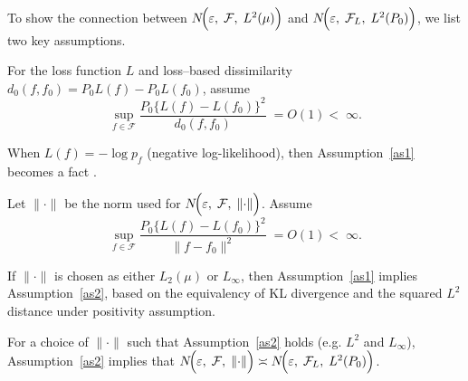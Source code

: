 To show the connection between $N\!\Bigl(\varepsilon,\; \mathcal{F},\; L^2(\mu)\Bigr)$ and $N\!\Bigl(\varepsilon,\; \mathcal{F}_L,\; L^2(P_0)\Bigr)$, we list two key assumptions.

\begin{assumption}\label{as1}
For the loss function \(L\) and loss–based dissimilarity 
\(d_{0}(f,f_{0}) = P_{0}L(f) - P_{0}L(f_{0})\),
assume 
\[
\sup_{f \in \mathcal{F}}
\frac{P_{0}\!\bigl\{L(f) - L(f_{0})\bigr\}^{2}}
     {d_{0}(f,f_{0})}
\;= O(1) <\;\infty.
\]
\end{assumption}

\begin{remark}
When \(L(f) = -\log p_f\) (negative log-likelihood), then Assumption~\ref{as1} becomes a fact \citet{van2004asymptotic}.
\end{remark}

\begin{assumption}\label{as2}
Let \(\lVert\cdot\rVert\) be the norm used for  $N\!\Bigl(\varepsilon,\; \mathcal{F},\; \lVert\cdot\rVert\Bigr)$.  
Assume
\[
\sup_{f \in \mathcal{F}}
\frac{P_{0}\!\bigl\{L(f) - L(f_{0})\bigr\}^{2}}
     {\lVert f - f_{0}\rVert^{2}}
\; = O(1) <\;\infty.
\]
\end{assumption}

\begin{remark}
If \(\lVert\cdot\rVert\) is chosen as either \(L_{2}(\mu)\) or \(L_{\infty}\),
then Assumption~\ref{as1} implies Assumption~\ref{as2}, based on the equivalency of KL divergence and the squared $L^2$ distance under positivity assumption.
\end{remark}

\begin{theorem}\label{Covering number equivalency}
For a choice of \(\lVert\cdot\rVert\) such that Assumption~\ref{as2} holds (e.g. $L^2$ and $L_{\infty}$), Assumption~\ref{as2} implies that $N\!\Bigl(\varepsilon,\; \mathcal{F},\; \lVert\cdot\rVert\Bigr) \asymp N\!\Bigl(\varepsilon,\; \mathcal{F}_L,\; L^2(P_0)\Bigr)$.
\end{theorem}

